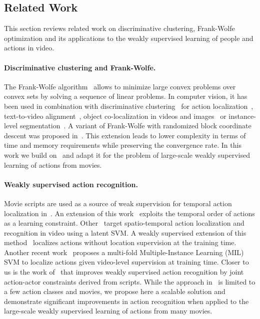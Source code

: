 \documentclass[10pt,twocolumn,letterpaper]{article}
\begin{document}
\subsection{Related Work}
This section reviews related work on discriminative clustering, Frank-Wolfe optimization and its applications to the weakly supervised learning of people and actions in video.


\vspace{-.4cm}
\paragraph{Discriminative clustering and Frank-Wolfe.}
The Frank-Wolfe algorithm~\cite{frank56algorithm,jaggi13revisiting} allows to minimize large convex problems over convex sets by solving a sequence of linear problems.
In computer vision, it has been used in combination with discriminative clustering~\cite{bach07diffrac} for action localization~\cite{bojanowski14weakly}, text-to-video alignment~\cite{alayrac16unsupervised,bojanowski15weakly}, object co-localization in videos and images~\cite{tang14efficient} or instance-level segmentation~\cite{seguin16instance}. A variant of Frank-Wolfe with randomized block coordinate descent was proposed in~\cite{lacoste13bcfw}.
This extension leads to lower complexity in terms of time and memory requirements while preserving the convergence rate.
In this work we build on~\cite{lacoste13bcfw} and adapt it for the problem of large-scale weakly supervised learning of actions from movies.



\vspace{-.4cm}
\paragraph{Weakly supervised action recognition.}
Movie scripts are used as a source of weak supervision for temporal action localization in~\cite{duchenne09automatic}.
An extension of this work~\cite{bojanowski14weakly} exploits the temporal order of actions as a learning constraint.
Other~\cite{lan11discriminative} target spatio-temporal action localization and recognition in video using a latent SVM.
A weakly supervised extension of this method~\cite{shapovalova12similarity} localizes actions without location supervision at the training time.
Another recent work~\cite{weinzaepfel16towards} proposes a multi-fold Multiple-Instance Learning (MIL) SVM to localize actions given video-level supervision at training time.
Closer to us is the work of~\cite{bojanowski13finding} that improves weakly supervised action recognition by joint action-actor constraints derived from scripts.
While the approach in~\cite{bojanowski13finding} is limited to a few action classes and movies, we propose here a scalable solution and demonstrate significant improvements in action recognition when applied to the large-scale weakly supervised learning of actions from many movies.
\end{document}
